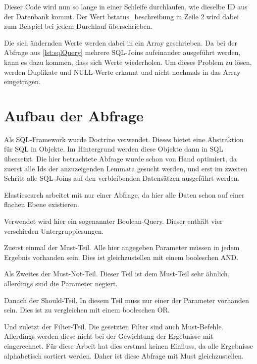Dieser Code wird nun so lange in einer Schleife durchlaufen, wie dieselbe ID aus der Datenbank kommt. Der Wert bstatus\_beschreibung in Zeile 2 wird dabei zum Beispiel bei jedem Durchlauf überschrieben. 

Die sich ändernden Werte werden dabei in ein Array geschrieben. Da bei der Abfrage aus \ref{lst:sqlQuery} mehrere SQL-Joins aufeinander ausgeführt werden, kann es dazu kommen, dass sich Werte wiederholen. Um dieses Problem zu lösen, werden Duplikate und NULL-Werte erkannt und nicht nochmals in das Array eingetragen.

\section{Aufbau der Abfrage}

Als SQL-Framework wurde Doctrine verwendet. Dieses bietet eine Abstraktion für SQL in Objekte. Im Hintergrund werden diese Objekte dann in SQL übersetzt. Die hier betrachtete Abfrage wurde schon von Hand optimiert, da zuerst alle Ids der anzuzeigenden Lemmata gesucht werden, und erst im zweiten Schritt alle SQL-Joins auf den verbleibenden Datensätzen ausgeführt werden.

Elasticsearch arbeitet mit nur einer Abfrage, da hier alle Daten schon auf einer flachen Ebene existieren.

Verwendet wird hier ein sogenannter Boolean-Query. Dieser enthält vier verschieden Untergruppierungen.

Zuerst einmal der Must-Teil. Alle hier angegeben Parameter müssen in jedem Ergebnis vorhanden sein. Dies ist gleichzustellen mit einem booleschen AND. 

Als Zweites der Must-Not-Teil. Dieser Teil ist dem Must-Teil sehr ähnlich, allerdings sind die Parameter negiert.

Danach der Should-Teil. In diesem Teil muss nur einer der Parameter vorhanden sein. Dies ist zu vergleichen mit einem booleschen OR. 

Und zuletzt der Filter-Teil. Die gesetzten Filter sind auch Must-Befehle. Allerdings werden diese nicht bei der Gewichtung der Ergebnisse mit eingerechnet. Für diese Arbeit hat dies erstmal keinen Einfluss, da alle Ergebnisse alphabetisch sortiert werden. Daher ist diese Abfrage mit Must gleichzustellen. \cite{ElasticsearchB.V..17.12.2019}


